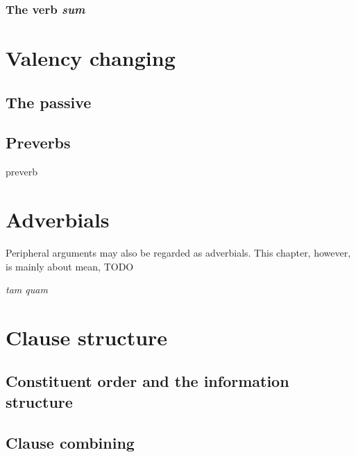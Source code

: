 \documentclass[a4paper, oneside]{report}
\newcommand{\corpus}[1]{\emph{#1}}
\begin{document}
\subsection{The verb \corpus{sum}}\label{sec:sum}

\chapter{Valency changing}

\section{The passive}\label{sec:passive}

\section{Preverbs}

preverb

\chapter{Adverbials}

Peripheral arguments may also be regarded as adverbials.
This chapter, however, is mainly about mean, TODO

\corpus{tam quam}

\chapter{Clause structure}

\section{Constituent order and the information structure}

\section{Clause combining}
\end{document}
